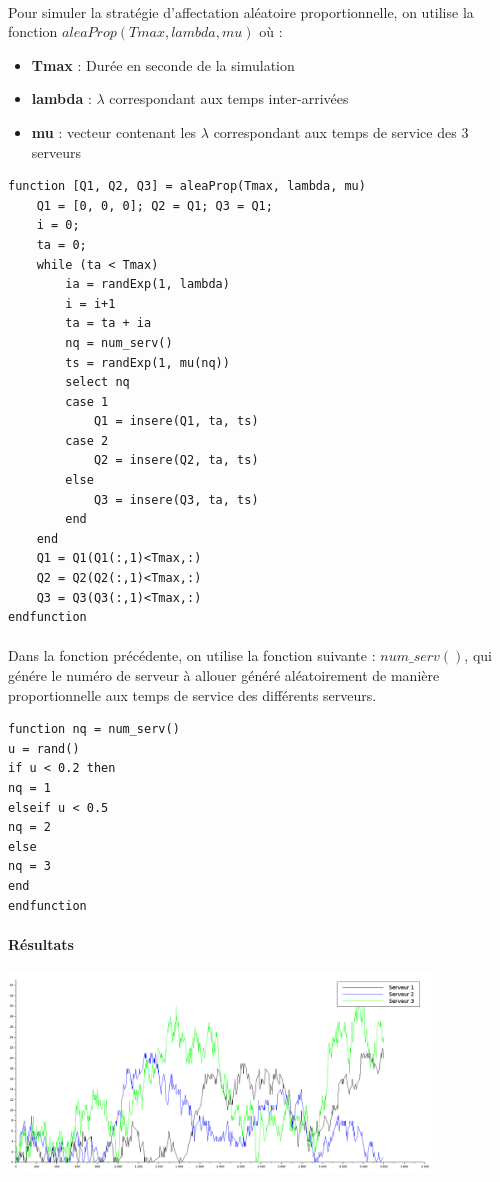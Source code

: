 \documentclass{article}
\begin{document}
\paragraph{}
Pour simuler la stratégie d'affectation aléatoire proportionnelle, on utilise la fonction $aleaProp(Tmax,lambda,mu)$ où :
\begin{itemize}
	\item \textbf{Tmax} : Durée en seconde de la simulation
	\item \textbf{lambda} : $\lambda$ correspondant aux temps inter-arrivées
	\item \textbf{mu} : vecteur contenant les $\lambda$ correspondant aux temps de service des 3 serveurs
\end{itemize}
\begin{verbatim}
function [Q1, Q2, Q3] = aleaProp(Tmax, lambda, mu)
    Q1 = [0, 0, 0]; Q2 = Q1; Q3 = Q1;
    i = 0;
    ta = 0;
    while (ta < Tmax)
        ia = randExp(1, lambda)
        i = i+1
        ta = ta + ia 
        nq = num_serv() 
        ts = randExp(1, mu(nq))
        select nq
        case 1
            Q1 = insere(Q1, ta, ts)
        case 2 
            Q2 = insere(Q2, ta, ts)
        else
            Q3 = insere(Q3, ta, ts)
        end
    end
    Q1 = Q1(Q1(:,1)<Tmax,:)
    Q2 = Q2(Q2(:,1)<Tmax,:) 
    Q3 = Q3(Q3(:,1)<Tmax,:) 
endfunction 
\end{verbatim}

\paragraph{}
Dans la fonction précédente, on utilise la fonction suivante : $num\_serv()$, qui génére le numéro de serveur à allouer généré aléatoirement de manière proportionnelle aux temps de service des différents serveurs.

\begin{verbatim}
function nq = num_serv()
u = rand()
if u < 0.2 then
nq = 1
elseif u < 0.5
nq = 2
else
nq = 3
end
endfunction
\end{verbatim}

\paragraph{Résultats}
\begin{center}
	\includegraphics[width=425px]{img/aleaProp.png}
\end{center}
\end{document}
